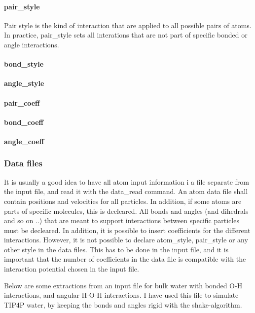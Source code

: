 \paragraph{pair\_style}
Pair style is the kind of interaction that are applied to all possible pairs of atoms. In practice, pair\_style sets all interations that are not part of specific bonded or angle interactions. 

\paragraph{bond\_style}

\paragraph{angle\_style}

\paragraph{pair\_coeff}

\paragraph{bond\_coeff}

\paragraph{angle\_coeff}


\subsubsection{Data files}
It is usually a good idea to have all atom input information i a file separate from the input file, and read it with the data\_read command. An atom data file shall contain positions and velocities for all particles. In addition, if some atoms are parts of specific molecules, this is decleared. All bonds and angles (and dihedrals and so on ..) that are meant to support interactions between specific particles must be decleared. In addition, it is possible to insert coefficients for the different interactions. However, it is not possible to declare atom\_style, pair\_style or any other style in the data files. This has to be done in the input file, and it is important that the number of coefficients in the data file is compatible with the interaction potential chosen in the input file. 

Below are some extractions from an input file for bulk water with bonded O-H interactions, and angular H-O-H interactions. I have used this file to simulate TIP4P water, by keeping the bonds and angles rigid with the shake-algorithm. 

